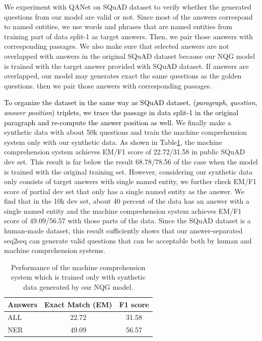 \documentclass[letterpaper]{article} %
\newcommand\Tstrut{\rule{0pt}{2.3ex}}         %
\newcommand{\hh}[1]{\textcolor{black}{#1}}
\begin{document}
We experiment with QANet \cite{yu2018qanet} on SQuAD dataset to verify whether the generated questions from our model are valid or not. Since most of the answers correspond to named entities, we use words and phrases that are named entities from training part of data split-1 as target answers. Then, we pair those answers with corresponding passages. We also make sure that selected answers are not overlapped with answers in the original SQuAD dataset because our NQG model is trained with the target answer provided with SQuAD dataset. If answers are overlapped, our model may generates exact the same questions as the golden questions. then we pair those answers with corresponding passages.

\hh{To organize the dataset in the same way as SQuAD dataset, (\textit{paragraph}, \textit{question}, \textit{answer position}) triplets, we trace the passage in data split-1 in the original paragraph and re-compute the answer position as well.} We finally make a synthetic data with about 50k questions and train the machine comprehension system only with our synthetic data.
As shown in Table\ref{table:qa}, the machine comprehension system achieves EM/F1 score of 22.72/31.58 in public SQuAD dev set. This result is far below the result 68.78/78.56 of the case when the model is trained with the original training set. However, considering our synthetic data only consists of target answers with single named entity, we further check EM/F1 score of partial dev set that only has a single named entity as the answer. We find that in the 10k dev set, about 40 percent of the data has an answer with a single named entity and the machine comprehension system achieves EM/F1 score of 49.09/56.57 with those parts of the data. Since the SQuAD dataset is a human-made dataset, this result sufficiently shows that our answer-separated seq2seq can generate valid questions that can be acceptable both by human and machine comprehension systems.


\begin{table}[!t]
\centering
\begin{tabular}{|l|c|c|}
\hline
Answers & Exact Match (EM)      & F1 score\Tstrut      \\ \hline
ALL     & 22.72       & 31.58\Tstrut       \\ \hline
NER     & 49.09 & 56.57\Tstrut \\ \hline
\end{tabular}%
\vspace{-2.90mm}
\caption{Performance of the machine comprehension system which is trained only with synthetic data generated by our NQG model.}
\label{table:qa}
\end{table}
\end{document}
